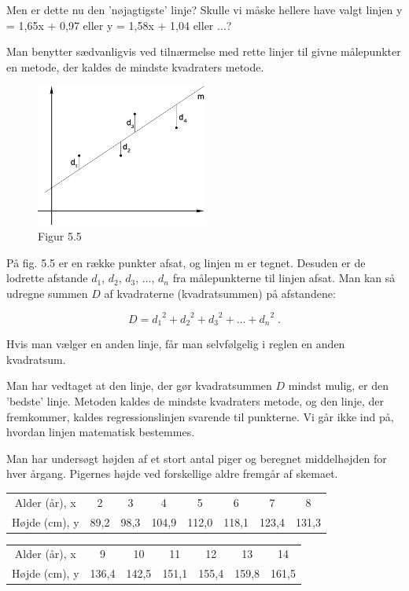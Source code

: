 \documentclass[12pt,oneside,a4paper]{article}
\begin{document}
Men er dette nu den 'nøjagtigste' linje? Skulle vi måske hellere have valgt
linjen y = 1,65x + 0,97 eller y = 1,58x + 1,04 eller ...?

Man benytter sædvanligvis ved tilnærmelse med rette linjer til givne
målepunkter en metode, der kaldes de mindste kvadraters metode.

\begin{figure}[ht]
    \centering
    \includegraphics[width=0.5\textwidth]{fig55}
    \caption{Figur 5.5}
    \label{fig55}
\end{figure}

På fig. 5.5 er en række punkter afsat, og linjen m er tegnet. Desuden er de
lodrette afstande $d_1$, $d_2$, $d_3$, ..., $d_n$ fra målepunkterne til linjen afsat. Man
kan så udregne summen $D$ af kvadraterne (kvadratsummen) på afstandene:

$$
D = {d_1}^2 + {d_2}^2 + {d_3}^2 + \ldots + {d_n}^2 \; . 
$$

Hvis man vælger en anden linje, får man selvfølgelig i reglen en anden kvadratsum.

Man har vedtaget at den linje, der gør kvadratsummen $D$ mindst mulig, er den
'bedste' linje. Metoden kaldes de mindste kvadraters metode, og den linje, der
fremkommer, kaldes regressionslinjen svarende til punkterne. Vi går ikke ind
på, hvordan linjen matematisk bestemmes. 


Man har undersøgt højden af et stort antal piger og beregnet middelhøjden for
hver årgang. Pigernes højde ved forskellige aldre fremgår af skemaet.

\begin{tabular}{c|c|c|c|c|c|c|c}
    Alder (år), x &  2 &  3 &  4 &  5 &  6 &  7 &  8 \\
    Højde (cm), y &  89,2 &   98,3 &   104,9 &  112,0 &  118,1 &  123,4 &  131,3
\end{tabular}

\begin{tabular}{c|c|c|c|c|c|c}
    Alder (år), x  & 9  & 10 & 11&  12 & 13 & 14 \\
    Højde (cm), y  & 136,4 &  142,5 &  151,1 &  155,4 &  159,8 &  161,5
\end{tabular}
\end{document}
